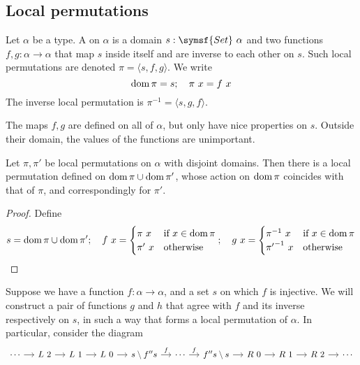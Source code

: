\subsection{Local permutations}

\begin{definition}
    Let \( \alpha \) be a type.
    A  on \( \alpha \) is a domain \( s : \symsf{Set}\ \alpha \) and two functions \( f, g : \alpha \to \alpha \) that map \( s \) inside itself and are inverse to each other on \( s \).
    Such local permutations are denoted \( \pi = \langle s, f, g \rangle \).
    We write
    \[ \dom \pi = s;\quad \pi\ x = f\ x \]
    The inverse local permutation is \( \pi^{-1} = \langle s, g, f \rangle \).
\end{definition}
\begin{remark}
    The maps \( f, g \) are defined on all of \( \alpha \), but only have nice properties on \( s \).
    Outside their domain, the values of the functions are unimportant.
\end{remark}
\begin{lemma}
    \label{lem:localPerm_piecewise}
    Let \( \pi, \pi' \) be local permutations on \( \alpha \) with disjoint domains.
    Then there is a local permutation defined on \( \operatorname{dom} \pi \cup \operatorname{dom} \pi' \), whose action on \( \operatorname{dom} \pi \) coincides with that of \( \pi \), and correspondingly for \( \pi' \).
\end{lemma}
\begin{proof}
    Define
    \[ s = \operatorname{dom} \pi \cup \operatorname{dom} \pi';\quad
    f\ x = \begin{cases}
        \pi\ x & \text{if } x \in \operatorname{dom} \pi \\
        \pi'\ x & \text{otherwise}
    \end{cases};\quad
    g\ x = \begin{cases}
        \pi^{-1}\ x & \text{if } x \in \operatorname{dom} \pi \\
        {\pi'}^{-1}\ x & \text{otherwise}
    \end{cases} \]
\end{proof}
Suppose we have a function \( f : \alpha \to \alpha \), and a set \( s \) on which \( f \) is injective.
We will construct a pair of functions \( g \) and \( h \) that agree with \( f \) and its inverse respectively on \( s \), in such a way that forms a local permutation of \( \alpha \).
In particular, consider the diagram
\[\begin{tikzcd}[column sep=small]
	\cdots & {L\ 2} & {L\ 1} & {L\ 0} & {s \setminus f''s} & \cdots & {f''s \setminus s} & {R\ 0} & {R\ 1} & {R\ 2} & \cdots
	\arrow[from=1-1, to=1-2]
	\arrow[from=1-2, to=1-3]
	\arrow[from=1-3, to=1-4]
	\arrow[from=1-4, to=1-5]
	\arrow["f", from=1-5, to=1-6]
	\arrow["f", from=1-6, to=1-7]
	\arrow[from=1-7, to=1-8]
	\arrow[from=1-8, to=1-9]
	\arrow[from=1-9, to=1-10]
	\arrow[from=1-10, to=1-11]
\end{tikzcd}\]
